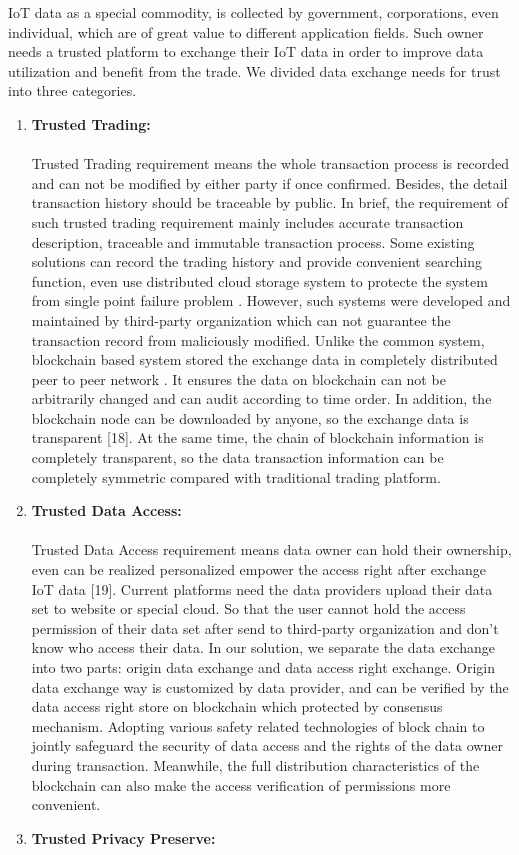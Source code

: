 IoT data as a special commodity, is collected by
government, corporations, even individual, which are of
great value to different application fields. Such owner needs
a trusted platform to exchange their IoT data in order to
improve data utilization and benefit from the trade. We
divided data exchange needs for trust into three categories.
\begin{enumerate}
\item \textbf{ Trusted Trading:}
\paragraph{}Trusted Trading requirement means the whole
transaction process is recorded and can not be modified by
either party if once confirmed. Besides, the detail transaction
history should be traceable by public.
In brief, the requirement of such trusted trading
requirement mainly includes accurate transaction description,
traceable and immutable transaction process. Some existing
solutions can record the trading history and provide
convenient searching function, even use distributed cloud
storage system to protecte the system from single point
failure problem . However, such systems were developed
and maintained by third-party organization which can not
guarantee the transaction record from maliciously modified.
Unlike the common system, blockchain based system
stored the exchange data in completely distributed peer to
peer network . It ensures the data on blockchain can not
be arbitrarily changed and can audit according to time order.
In addition, the blockchain node can be downloaded by
anyone, so the exchange data is transparent [18]. At the same
time, the chain of blockchain information is completely
transparent, so the data transaction information can be
completely symmetric compared with traditional trading
platform.
\item \textbf{Trusted Data Access:}
\paragraph{}Trusted Data Access requirement means data owner can
hold their ownership, even can be realized personalized
empower the access right after exchange IoT data [19].
Current platforms need the data providers upload their
data set to website or special cloud. So that the user cannot
hold the access permission of their data set after send to
third-party organization and don’t know who access their
data. In our solution, we separate the data exchange into two
parts: origin data exchange and data access right exchange.
Origin data exchange way is customized by data provider,
and can be verified by the data access right store on
blockchain which protected by consensus mechanism.
Adopting various safety related technologies of block chain
to jointly safeguard the security of data access and the rights
of the data owner during transaction. Meanwhile, the full
distribution characteristics of the blockchain can also make
the access verification of permissions more convenient.
\item \textbf{Trusted Privacy Preserve:}

\end{enumerate}

